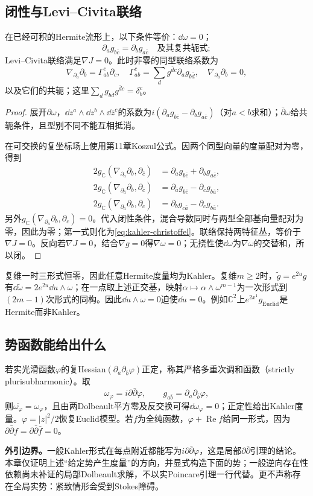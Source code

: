 \subsection{闭性与Levi--Civita联络}
\begin{theorem}\label{thm:kahler-parallel}
在已经可积的Hermite流形上，以下条件等价：$\dd\omega=0$；
\[
 \partial_a g_{b\bar c}=\partial_b g_{a\bar c}
 \quad\text{及其复共轭式};
\]
Levi--Civita联络满足$\nabla J=0$。此时非零的同型联络系数为
\begin{equation}\label{eq:kahler-christoffel}
 \nabla_{\partial_a}\partial_b=\Gamma^c_{ab}\partial_c,
 \quad\Gamma^c_{ab}=\sum_d g^{\bar d c}\partial_a g_{b\bar d},
 \quad\nabla_{\partial_{\bar a}}\partial_b=0,
\end{equation}
以及它们的共轭；这里$\sum_dg_{b\bar d}g^{\bar d c}=\delta_b^c$。
\end{theorem}
\begin{proof}
展开$\partial\omega$，$\dd z^a\wedge\dd z^b\wedge\dd\bar z^c$的系数为$i(\partial_ag_{b\bar c}-\partial_bg_{a\bar c})$（对$a<b$求和）；$\bar\partial\omega$给共轭条件，且型别不同不能互相抵消。

在可交换的复坐标场上使用第11章Koszul公式。因两个同型向量的度量配对为零，得到
\begin{align*}
 2g_{\mathbb C}(\nabla_{\partial_a}\partial_b,\partial_{\bar c})
 &=\partial_ag_{b\bar c}+\partial_bg_{a\bar c},\\
 2g_{\mathbb C}(\nabla_{\partial_{\bar a}}\partial_b,\partial_{\bar c})
 &=\partial_{\bar a}g_{b\bar c}-\partial_{\bar c}g_{b\bar a},\\
 2g_{\mathbb C}(\nabla_{\partial_{\bar a}}\partial_b,\partial_c)
 &=\partial_bg_{c\bar a}-\partial_cg_{b\bar a}.
\end{align*}
另外$g_{\mathbb C}(\nabla_{\partial_a}\partial_b,\partial_c)=0$。代入闭性条件，混合导数同时与两型全部基向量配对为零，因此为零；第一式则化为\eqref{eq:kahler-christoffel}。联络保持两特征丛，等价于$\nabla J=0$。反向若$\nabla J=0$，结合$\nabla g=0$得$\nabla\omega=0$；无挠性使$\dd\omega$为$\nabla\omega$的交替和，所以闭。
\end{proof}
复维一时三形式恒零，因此任意Hermite度量均为Kahler。复维$m\geq2$时，$\widetilde g=e^{2u}g$有$\dd\widetilde\omega=2e^{2u}\dd u\wedge\omega$；在一点取上述正交基，映射$\alpha\mapsto\alpha\wedge\omega^{m-1}$为一次形式到$(2m-1)$次形式的同构。因此$\dd u\wedge\omega=0$迫使$\dd u=0$。例如$\mathbb C^2$上$e^{2x^1}g_{\mathrm{Euclid}}$是Hermite而非Kahler。

\subsection{势函数能给出什么}
若实光滑函数$\varphi$的复Hessian$(\partial_a\partial_{\bar b}\varphi)$正定，称其严格多重次调和函数（strictly plurisubharmonic）。取
\[
 \omega_\varphi=i\partial\bar\partial\varphi,
 \qquad g_{a\bar b}=\partial_a\partial_{\bar b}\varphi,
\]
则$\overline{\omega_\varphi}=\omega_\varphi$，且由两Dolbeault平方零及反交换可得$\dd\omega_\varphi=0$；正定性给出Kahler度量。$\varphi=|z|^2/2$恢复Euclid模型。若$f$为全纯函数，$\varphi+\operatorname{Re}f$给同一形式，因为$\partial\bar\partial f=\partial\bar\partial\bar f=0$。

\textbf{外引边界。}一般Kahler形式在每点附近都能写为$i\partial\bar\partial\varphi$，这是局部$\partial\bar\partial$引理的结论。本章仅证明上述“给定势产生度量”的方向，并显式构造下面的势；一般逆向存在性依赖尚未补证的局部Dolbeault求解，不以实Poincare引理一行代替。更不声称存在全局实势：紧致情形会受到Stokes障碍。
